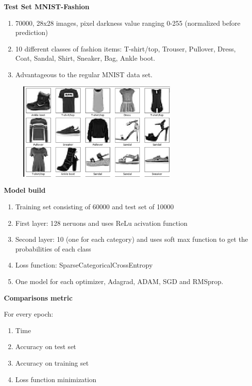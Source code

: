 \documentclass{beamer}
\newcommand\myheading[1]{%
  \par\bigskip
  {\Large\bfseries#1}\par\smallskip}
\begin{document}
\begin{frame}
    \myheading{Test Set MNIST-Fashion}
    \begin{enumerate}
        \item 70000, 28x28 images, pixel darkness value ranging 0-255 (normalized before prediction)
        \item 10 different classes of fashion items: T-shirt/top, Trouser, Pullover, Dress, Coat,
               Sandal, Shirt, Sneaker, Bag, Ankle boot.
        \item Advantageous to the regular MNIST data set. 
    \end{enumerate}
\end{frame}

\begin{frame}
     \begin{figure}[h]
        \includegraphics[width=8cm]{report/figures/example_items.pdf}
    \end{figure}
\end{frame}

\begin{frame}
    \myheading{Model build}
    \begin{enumerate}
        \item{Training set consisting of 60000 and test set of 10000}
        \item First layer: 128 neruons and uses ReLu acivation function
        \item Second layer: 10 (one for each category) and uses soft max function to get the probabilities of each class
        \item Loss function: SparseCategoricalCrossEntropy
        \item One model for each optimizer, Adagrad, ADAM, SGD and RMSprop. 
    \end{enumerate}
\end{frame}

\begin{frame}
    \myheading{Comparisons metric}
    For every epoch:
    \begin{enumerate}
        \item Time
        \item Accuracy on test set 
        \item Accuracy on training set
        \item Loss function minimization
    \end{enumerate}
\end{frame}
\end{document}
